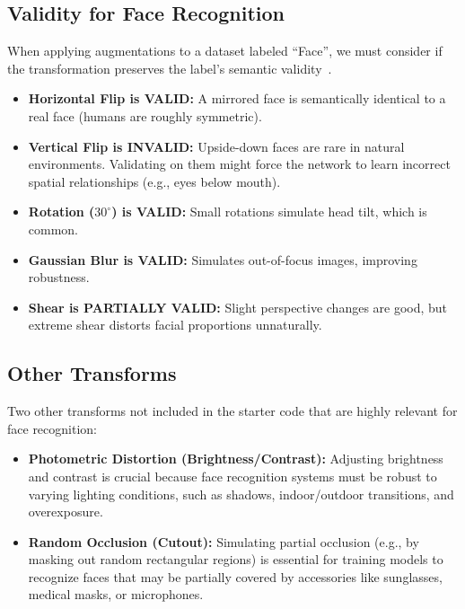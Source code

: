 \documentclass[12pt]{article}
\begin{document}
\subsection{Validity for Face Recognition}
When applying augmentations to a dataset labeled ``Face'', we must consider if the transformation preserves the label's semantic validity~\cite{shorten2019survey}.
\begin{itemize}
    \item \textbf{Horizontal Flip is VALID:} A mirrored face is semantically identical to a real face (humans are roughly symmetric).
    \item \textbf{Vertical Flip is INVALID:} Upside-down faces are rare in natural environments. Validating on them might force the network to learn incorrect spatial relationships (e.g., eyes below mouth).
    \item \textbf{Rotation ($30^\circ$) is VALID:} Small rotations simulate head tilt, which is common.
    \item \textbf{Gaussian Blur is VALID:} Simulates out-of-focus images, improving robustness.
    \item \textbf{Shear is PARTIALLY VALID:} Slight perspective changes are good, but extreme shear distorts facial proportions unnaturally.
\end{itemize}
\subsection{Other Transforms}
Two other transforms not included in the starter code that are highly relevant for face recognition:
\begin{itemize}
    \item \textbf{Photometric Distortion (Brightness/Contrast):} Adjusting brightness and contrast is crucial because face recognition systems must be robust to varying lighting conditions\cite{sun2005geometric}, such as shadows, indoor/outdoor transitions, and overexposure.
    \item \textbf{Random Occlusion (Cutout):} Simulating partial occlusion\cite{fong2019occlusions} (e.g., by masking out random rectangular regions) is essential for training models to recognize faces that may be partially covered by accessories like sunglasses, medical masks, or microphones.
\end{itemize}

\newpage


\end{document}

